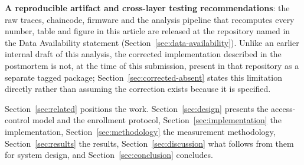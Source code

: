 \textbf{A reproducible artifact and cross-layer testing recommendations}: the raw traces, chaincode, firmware and the analysis pipeline that recomputes every number, table and figure in this article are released at the repository named in the Data Availability statement (Section~\ref{sec:data-availability}). Unlike an earlier internal draft of this analysis, the corrected implementation described in the postmortem is not, at the time of this submission, present in that repository as a separate tagged package; Section~\ref{sec:corrected-absent} states this limitation directly rather than assuming the correction exists because it is specified.

Section~\ref{sec:related} positions the work. Section~\ref{sec:design} presents the access-control model and the enrollment protocol, Section~\ref{sec:implementation} the implementation, Section~\ref{sec:methodology} the measurement methodology, Section~\ref{sec:results} the results, Section~\ref{sec:discussion} what follows from them for system design, and Section~\ref{sec:conclusion} concludes.
